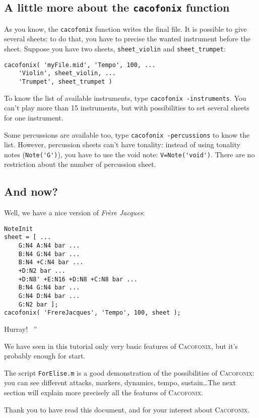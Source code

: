 \documentclass{article}
\newcommand\cacofonix{\textsc{Cacofonix}\xspace}
\newcommand\frerejaques{\emph{Fr\`ere Jacques}\xspace}
\newenvironment{meenv}{ \par \noindent \makebox[6em][r]{ \textcolor{mecolor}{Me}: `` --~}}{~''}
\newcommand{ \me }[1]{%
\begin{meenv}%
	#1%
\end{meenv} }
\begin{document}
\subsection{A little more about the \lstinline!cacofonix! function}

As you know, the \lstinline!cacofonix! function writes the final file. It is possible to give several sheets: to do that, you have to precise the wanted instrument before the sheet. Suppose you have two sheets, \lstinline!sheet_violin! and \lstinline!sheet_trumpet!:
\begin{lstlisting}
cacofonix( 'myFile.mid', 'Tempo', 100, ...
	'Violin', sheet_violin, ...
	'Trumpet', sheet_trumpet )
\end{lstlisting}

To know the list of available instruments, type \lstinline!cacofonix -instruments!. You can't play more than 15 instruments, but with possibilities to set several sheets for one instrument.

Some percussions are available too, type \lstinline!cacofonix -percussions! to know the list. However, percussion sheets can't have tonality: instead of using tonality notes (\lstinline!Note('G')!), you have to use the void note: \lstinline!V=Note('void')!. There are no restriction about the number of percussion sheet.

\subsection{And now?}

Well, we have a nice version of \frerejaques:
\begin{lstlisting}
NoteInit
sheet = [ ...
	G:N4 A:N4 bar ...
	B:N4 G:N4 bar ...
	B:N4 +C:N4 bar ...
	+D:N2 bar ...
	+D:N8' +E:N16 +D:N8 +C:N8 bar ...
	B:N4 G:N4 bar ...
	G:N4 D:N4 bar ...
	G:N2 bar ];
cacofonix( 'FrereJacques', 'Tempo', 100, sheet );
\end{lstlisting}

\me{Hurray!}

We have seen in this tutorial only very basic features of \cacofonix, but it's probably enough for start.

The script \texttt{ForElise.m} is a good demonstration of the possibilities of \cacofonix: you can see different attacks, markers, dynamics, tempo, sustain\dots The next section will explain more precisely all the features of \cacofonix.

Thank you to have read this document, and for your interest about \cacofonix.
\end{document}
